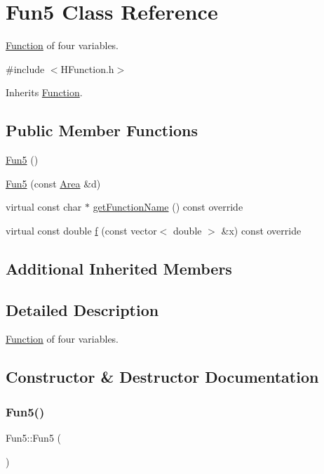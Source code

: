 \hypertarget{class_fun5}{}\section{Fun5 Class Reference}
\label{class_fun5}


\hyperlink{class_function}{Function} of four variables.  




{\ttfamily \#include $<$H\+Function.\+h$>$}



Inherits \hyperlink{class_function}{Function}.

\subsection*{Public Member Functions}
\begin{DoxyCompactItemize}
\item 
\hyperlink{class_fun5_a9999d4d46a05ce8cbb2bd2b90d92bff0}{Fun5} ()
\item 
\hyperlink{class_fun5_afc0af29fcd319a88b4af446cfacd5533}{Fun5} (const \hyperlink{class_area}{Area} \&d)
\item 
virtual const char $\ast$ \hyperlink{class_fun5_acaa887c03e39c037f49205b3b20b7464}{get\+Function\+Name} () const override
\item 
virtual const double \hyperlink{class_fun5_ae85d60bda47bb388c18723e4e887d409}{f} (const vector$<$ double $>$ \&x) const override
\end{DoxyCompactItemize}
\subsection*{Additional Inherited Members}


\subsection{Detailed Description}
\hyperlink{class_function}{Function} of four variables. 

\subsection{Constructor \& Destructor Documentation}
\mbox{\label{class_fun5_a9999d4d46a05ce8cbb2bd2b90d92bff0}} 
\subsubsection{\texorpdfstring{Fun5()}{Fun5()}\hspace{0.1cm}{\footnotesize\ttfamily [1/2]}}
{\footnotesize\ttfamily Fun5\+::\+Fun5 (\begin{DoxyParamCaption}{ }\end{DoxyParamCaption})}


